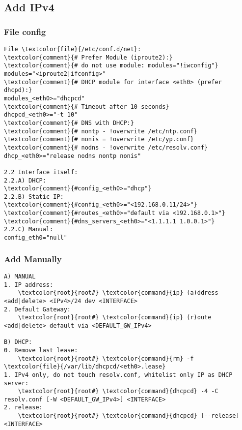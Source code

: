 \documentclass[10pt, a4paper, onecolumn, openany]{book}         %
\begin{document}
\subsection{Add IPv4}
\subsubsection{File config}
\begin{Verbatim}[commandchars=\\\{\}]
File \textcolor{file}{/etc/conf.d/net}:
\textcolor{comment}{# Prefer Module (iproute2):}
\textcolor{comment}{# do not use module: modules="!iwconfig"}
modules="<iproute2|ifconfig>"
\textcolor{comment}{# DHCP module for interface <eth0> (prefer dhcpd):}
modules_<eth0>="dhcpcd"
\textcolor{comment}{# Timeout after 10 seconds}
dhcpcd_<eth0>="-t 10" 
\textcolor{comment}{# DNS with DHCP:}
\textcolor{comment}{# nontp - !overwrite /etc/ntp.conf}
\textcolor{comment}{# nonis = !overwrite /etc/yp.conf}
\textcolor{comment}{# nodns - !overwrite /etc/resolv.conf}
dhcp_<eth0>="release nodns nontp nonis"

2.2 Interface itself:
2.2.A) DHCP:
\textcolor{comment}{#config_<eth0>="dhcp"}
2.2.B) Static IP:
\textcolor{comment}{#config_<eth0>="<192.168.0.11/24>"}
\textcolor{comment}{#routes_<eth0>="default via <192.168.0.1>"}
\textcolor{comment}{#dns_servers_<eth0>="<1.1.1.1 1.0.0.1>"}
2.2.C) Manual:
config_eth0="null"
\end{Verbatim}

\subsubsection{Add Manually}
\begin{Verbatim}[commandchars=\\\{\}]
A) MANUAL
1. IP address:
    \textcolor{root}{root#} \textcolor{command}{ip} (a)ddress <add|delete> <IPv4>/24 dev <INTERFACE>
2. Default Gateway:
    \textcolor{root}{root#} \textcolor{command}{ip} (r)oute <add|delete> default via <DEFAULT_GW_IPv4>
    
B) DHCP:
0. Remove last lease:
    \textcolor{root}{root#} \textcolor{command}{rm} -f \textcolor{file}{/var/lib/dhcpcd/<eth0>.lease}
1. IPv4 only, do not touch resolv.conf, whitelist only IP as DHCP server:
    \textcolor{root}{root#} \textcolor{command}{dhcpcd} -4 -C resolv.conf [-W <DEFAULT_GW_IPv4>] <INTERFACE>
2. release:
    \textcolor{root}{root#} \textcolor{command}{dhcpcd} [--release] <INTERFACE>
\end{Verbatim}
\end{document}
